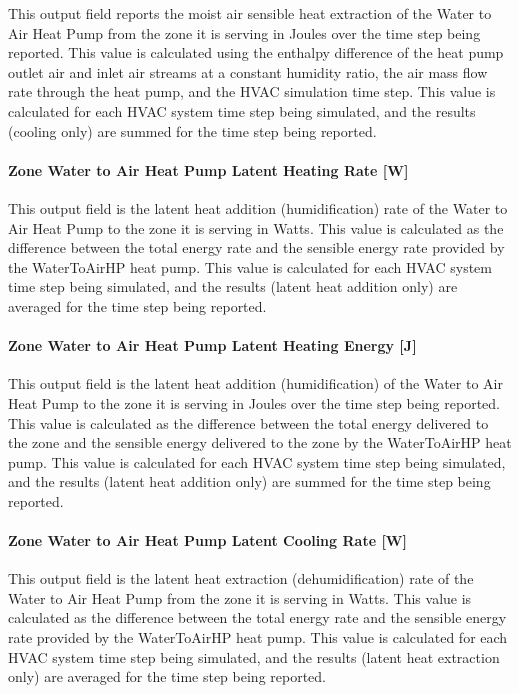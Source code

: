This output field reports the moist air sensible heat extraction of the Water to Air Heat Pump from the zone it is serving in Joules over the time step being reported. This value is calculated using the enthalpy difference of the heat pump outlet air and inlet air streams at a constant humidity ratio, the air mass flow rate through the heat pump, and the HVAC simulation time step. This value is calculated for each HVAC system time step being simulated, and the results (cooling only) are summed for the time step being reported.

\paragraph{Zone Water to Air Heat Pump Latent Heating Rate {[}W{]}}\label{zone-water-to-air-heat-pump-latent-heating-rate-w}

This output field is the latent heat addition (humidification) rate of the Water to Air Heat Pump to the zone it is serving in Watts. This value is calculated as the difference between the total energy rate and the sensible energy rate provided by the WaterToAirHP heat pump. This value is calculated for each HVAC system time step being simulated, and the results (latent heat addition only) are averaged for the time step being reported.

\paragraph{Zone Water to Air Heat Pump Latent Heating Energy {[}J{]}}\label{zone-water-to-air-heat-pump-latent-heating-energy-j}

This output field is the latent heat addition (humidification) of the Water to Air Heat Pump to the zone it is serving in Joules over the time step being reported. This value is calculated as the difference between the total energy delivered to the zone and the sensible energy delivered to the zone by the WaterToAirHP heat pump. This value is calculated for each HVAC system time step being simulated, and the results (latent heat addition only) are summed for the time step being reported.

\paragraph{Zone Water to Air Heat Pump Latent Cooling Rate {[}W{]}}\label{zone-water-to-air-heat-pump-latent-cooling-rate-w}

This output field is the latent heat extraction (dehumidification) rate of the Water to Air Heat Pump from the zone it is serving in Watts. This value is calculated as the difference between the total energy rate and the sensible energy rate provided by the WaterToAirHP heat pump. This value is calculated for each HVAC system time step being simulated, and the results (latent heat extraction only) are averaged for the time step being reported.

